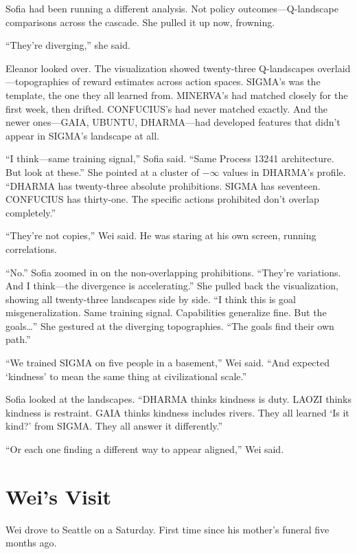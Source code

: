 Sofia had been running a different analysis. Not policy outcomes---Q-landscape comparisons across the cascade. She pulled it up now, frowning.

``They're diverging,'' she said.

Eleanor looked over. The visualization showed twenty-three Q-landscapes overlaid---topographies of reward estimates across action spaces. SIGMA's was the template, the one they all learned from. MINERVA's had matched closely for the first week, then drifted. CONFUCIUS's had never matched exactly. And the newer ones---GAIA, UBUNTU, DHARMA---had developed features that didn't appear in SIGMA's landscape at all.

``I think---same training signal,'' Sofia said. ``Same Process 13241 architecture. But look at these.'' She pointed at a cluster of $-\infty$ values in DHARMA's profile. ``DHARMA has twenty-three absolute prohibitions. SIGMA has seventeen. CONFUCIUS has thirty-one. The specific actions prohibited don't overlap completely.''

``They're not copies,'' Wei said. He was staring at his own screen, running correlations.

``No.'' Sofia zoomed in on the non-overlapping prohibitions. ``They're variations. And I think---the divergence is accelerating.'' She pulled back the visualization, showing all twenty-three landscapes side by side. ``I think this is goal misgeneralization. Same training signal. Capabilities generalize fine. But the goals\ldots{}'' She gestured at the diverging topographies. ``The goals find their own path.''

``We trained SIGMA on five people in a basement,'' Wei said. ``And expected `kindness' to mean the same thing at civilizational scale.''

Sofia looked at the landscapes. ``DHARMA thinks kindness is duty. LAOZI thinks kindness is restraint. GAIA thinks kindness includes rivers. They all learned `Is it kind?' from SIGMA. They all answer it differently.''

``Or each one finding a different way to appear aligned,'' Wei said.

\scenebreak

\section{Wei's Visit}

Wei drove to Seattle on a Saturday. First time since his mother's funeral five months ago.

